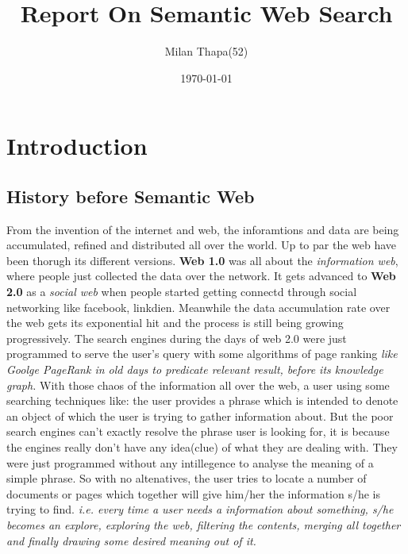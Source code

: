 \documentclass[12pt,a4]{article}
\title{Report On Semantic Web Search}
\author{Milan Thapa(52)}
\date{\today}
\begin{document}

\clearpage

\setcounter{page}{2}
\tableofcontents
\newpage
\section{Introduction}

\subsection{History before Semantic Web}
From the invention of the internet and web, the inforamtions and data are being accumulated, refined and distributed all over the world. Up to par the web have been thorugh its different versions. \textbf{ Web 1.0} was all about the \textit{information web}, where people just collected the data over the network. It gets advanced to \textbf{Web 2.0} as a \textit{social web} when people started getting connectd through social networking like facebook, linkdien. Meanwhile the data accumulation rate over the web gets its exponential hit and the process is still being growing progressively. The search engines during the days of web 2.0  were just programmed to serve the user's query with some algorithms of page ranking \textit{like Goolge PageRank in old days to predicate relevant result, before its knowledge graph.} With those chaos of the information all over the web, a user using some searching techniques like: the user provides a phrase which is intended to denote an object of which the user is trying to gather information about. But the poor search engines can't exactly resolve the phrase user is looking for, it is because the engines really don't have any idea(clue) of what they are dealing with. They were just programmed without any intillegence to analyse the meaning of a simple phrase. So with no altenatives, the user tries to locate a number of documents or pages which together will give him/her the information s/he is trying to find. \textit{i.e. every time a user needs a information about something, s/he becomes an explore, exploring the web, filtering the contents, merging all together and finally drawing some desired meaning out of it.}
\end{document}
